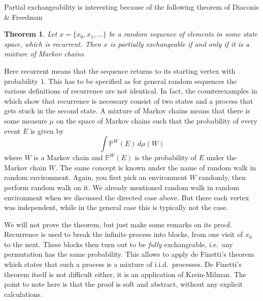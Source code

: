 \documentclass{emsprocart}
\theoremstyle{plain}
\newtheorem{thm}{Theorem}
\begin{document}
Partial exchangeability is interesting because of the following theorem
of Diaconis \& Freedman \cite{DF80}
\begin{thm}
Let $x=\{x_{0},x_{1},\dotsc\}$ be a random sequence of elements in
some state space, which is recurrent. Then $x$ is partially exchangeable
if and only if it is a mixture of Markov chains.
\end{thm}
Here recurrent means that the sequence returns to its starting vertex
with probability $1$. This has to be specified as for general random
sequences the various definitions of recurrence are not identical.
In fact, the counterexamples in \cite{DF80} which show that recurrence
is necessary consist of two states and a process that gets stuck in
the second state. A mixture of Markov chains means that there is some
measure $\mu$ on the space of Markov chains such that the probability
of every event $E$ is given by
\[
\int\mathbb{P}^{W}(E)\, d\mu(W)
\]
where $W$ is a Markov chain and $\mathbb{P}^{W}(E)$ is the probability
of $E$ under the Markov chain $W$. The same concept is known under
the name of random walk in random environment. Again, you first pick
an environment $W$ randomly, then perform random walk on it.
We already mentioned random walk in random environment when we discussed
the directed case above. But there each vertex was independent, while
in the general case this is typically not the case.

We will not prove the theorem, but just make some remarks on its proof.
Recurrence is used to break the infinite process into blocks, from
one visit of $x_{0}$ to the next. These blocks then turn out to be
\emph{fully} exchangeable, i.e.\ any permutation has the same probability.
This allows to apply de Finetti's theorem which states that such a
process is a mixture of i.i.d.\ processes. De Finetti's theorem itself
is not difficult either, it is an application of Krein-Milman. The
point to note here is that the proof is soft and abstract, without
any explicit calculations.
\end{document}
